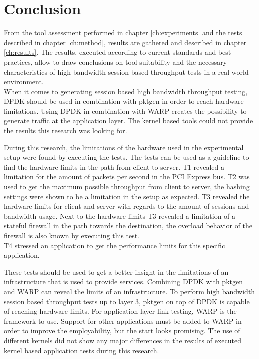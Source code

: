 \chapter{Conclusion}\label{ch:conclusion}
From the tool assessment performed in chapter \ref{ch:experiments} and the tests described in chapter \ref{ch:method}, results are gathered and described in chapter \ref{ch:results}.
The results, executed according to current standards and best practices, allow to draw conclusions on tool suitability and the necessary characteristics of high-bandwidth session based throughput tests in a real-world environment. \\
When it comes to generating session based high bandwidth throughput testing, DPDK should be used in combination with pktgen in order to reach hardware limitations. 
Using DPDK in combination with WARP creates the possibility to generate traffic at the application layer. 
The kernel based tools could not provide the results this research was looking for. 

During this research, the limitations of the hardware used in the experimental setup were found by executing the tests. 
The tests can be used as a guideline to find the hardware limits in the path from client to server. 
T1 revealed  a limitation for the amount of packets per second in the PCI Express bus. 
T2 was used to get the maximum possible throughput from client to server, the hashing settings were shown to be a limitation in the setup as expected.
T3 revealed the hardware limits for client and server with regards to the amount of sessions and bandwidth usage.
Next to the hardware  limits T3 revealed a limitation of a stateful firewall in the path towards the destination, the overload behavior of the firewall is also known by executing this test.\\ 
T4 stressed an application to get the performance limits for this specific application.
 
These tests should be used to get a better insight in the limitations of an infrastructure that is used to provide services.
Combining DPDK with pktgen and WARP can reveal the limits of an infrastructure.
To perform high bandwidth session based throughput tests up to layer 3, pktgen on top of DPDK is capable of reaching hardware limits.
For application layer link testing, WARP is the framework to use. Support for other applications must be added to WARP in order to improve the employability, but the start looks promising.
The use of different kernels did not show any major differences in the results of executed kernel based application tests during this research. 

